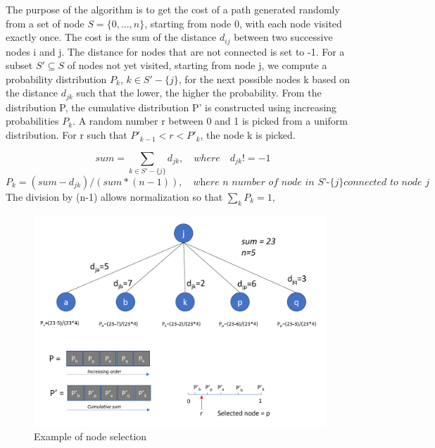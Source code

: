 \documentclass[../report.tex]{subfiles}
\begin{document}
The purpose of the algorithm is to get the cost of a path generated randomly from a set of node $S=\{0,...,n\}$, starting from node 0, with each node visited exactly once. The cost is the sum of the distance $d_{ij}$ between two successive nodes i and j. The distance for nodes that are not connected is set to -1.
\newline{} 
For a subset $S'\subseteq S$ of nodes not yet visited, starting from node j, we compute a probability distribution $P_{k}$, $k \in S'-\{j\}$, for the next possible nodes k based on the distance $d_{jk}$ such that the lower, the higher the probability. From the distribution P, the cumulative distribution P' is constructed using increasing probabilities $P_{k}$.  A random number r between 0 and 1 is picked from a uniform distribution. For r such that $P'_{k-1}< r <P'_{k}$, the node k is picked.


\[ sum = \sum_{k \in S'-\{j\}} d_{jk}, \quad {where} \quad d_{jk}!=-1 \]   
\[ P_{k} = (sum - d_{jk})/(sum*(n-1)), \quad \textit{where n number of node in S'-\{j\} connected to node j}\]
The division by (n-1) allows normalization so that $\sum_{k} P_{k}=1$,

\begin{figure}[ht]
\centering
\includegraphics[width=11cm]{../Images/random_algo.jpg}
\caption{Example of node selection \label{overflow}}
\end{figure}
\end{document}
